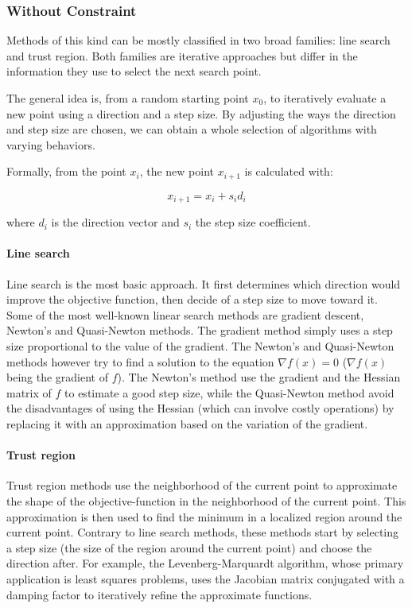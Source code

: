 \subsubsection{Without Constraint}

Methods of this kind can be mostly classified in two broad families: line search and trust region.
Both families are iterative approaches but differ in the information they use to select the next search point.

The general idea is, from a random starting point $x_0$, to iteratively evaluate a new point using a direction and a step size.
By adjusting the ways the direction and step size are chosen, we can obtain a whole selection of algorithms with varying behaviors.

Formally, from the point $x_i$, the new point $x_{i+1}$ is calculated with:

\[ x_{i+1} = x_i +s_id_i \]

where $d_i$ is the direction vector and $s_i$ the step size coefficient.

\paragraph{Line search}

Line search is the most basic approach. It first determines which direction would improve the objective function, then decide of a step size to move toward it.
Some of the most well-known linear search methods are gradient descent, Newton's and Quasi-Newton methods. The gradient method simply uses a step size proportional to the value of the gradient. The Newton's and Quasi-Newton methods however try to find a solution to the equation $\nabla f(x)=0$ ($\nabla f(x)$ being the gradient of $f$). The Newton's method use the gradient  and the Hessian matrix of $f$ to estimate a good step size, while the Quasi-Newton method avoid the disadvantages of using the Hessian (which can involve costly operations) by replacing it with an approximation based on the variation of the gradient.

\paragraph{Trust region}

Trust region methods use the neighborhood of the current point to approximate the shape of the objective-function in the neighborhood of the current point. This approximation is then used to find the minimum in a localized region around the current point. Contrary to line search methods, these methods start by selecting a step size (the size of the region around the current point) and choose the direction after.
For example, the Levenberg-Marquardt algorithm, whose primary application is least squares problems, uses the Jacobian matrix conjugated with a damping factor to iteratively refine the approximate functions.

